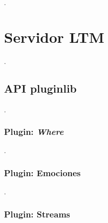 
.

\section{Servidor LTM}

.

\subsection{API pluginlib}

.
\subsubsection{Plugin: \textit{Where}}

.
\subsubsection{Plugin: Emociones}

.
\subsubsection{Plugin: Streams}

